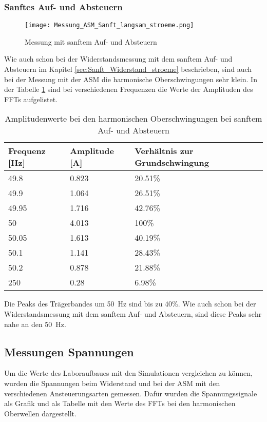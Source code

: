 \newpage
\subsubsection*{Sanftes Auf- und Absteuern}
\begin{figure}[ht!]
	\centering
	\texttt{[image: Messung\_ASM\_Sanft\_langsam\_stroeme.png]}	
	\caption{Messung mit sanftem Auf- und Absteuern}\label{fig:Mess_Sanft_langsam_stroeme}
\end{figure}

Wie auch schon bei der Widerstandsmessung mit dem sanftem Auf- und Absteuern im Kapitel \ref{sec:Sanft_Widerstand_stroeme} beschrieben, sind auch bei der Messung mit der ASM die harmonische Oberschwingungen sehr klein. In der Tabelle \ref{tab:Sanft_langsam_ASM_stroeme} sind bei verschiedenen Frequenzen die Werte der Amplituden des FFTs aufgelistet. 

\begin{table}[ht!]
	\centering
	\begin{tabular}{|l|l|l|}
		\hline
		Frequenz {[}Hz{]} & Amplitude {[}A{]} & Verhältnis zur Grundschwingung	\\ \hline
		49.8              & 0.823             & 20.51\%							\\ \hline
		49.9              & 1.064             & 26.51\%							\\ \hline
		49.95             & 1.716             & 42.76\%							\\ \hline
		50                & 4.013             & 100\%							\\ \hline
		50.05             & 1.613             & 40.19\%							\\ \hline
		50.1              & 1.141             & 28.43\%							\\ \hline
		50.2              & 0.878             & 21.88\%							\\ \hline
		250               & 0.28              & 6.98\%							\\ \hline
	\end{tabular}
	\caption{Amplitudenwerte bei den harmonischen Oberschwingungen bei sanftem Auf- und Absteuern}\label{tab:Sanft_langsam_ASM_stroeme}
\end{table}

Die Peaks des Trägerbandes um \SI{50}{Hz} sind bis zu 40\%. Wie auch schon bei der Widerstandsmessung mit dem sanftem Auf- und Absteuern, sind diese Peaks sehr nahe an den \SI{50}{Hz}.


\newpage
\subsection{Messungen Spannungen}
Um die Werte des Laboraufbaues mit den Simulationen vergleichen zu können, wurden die Spannungen beim Widerstand und bei der ASM mit den verschiedenen Ansteuerungsarten gemessen. Dafür wurden die Spannungssignale als Grafik und als Tabelle mit den Werte des FFTs bei den harmonischen Oberwellen dargestellt. 

